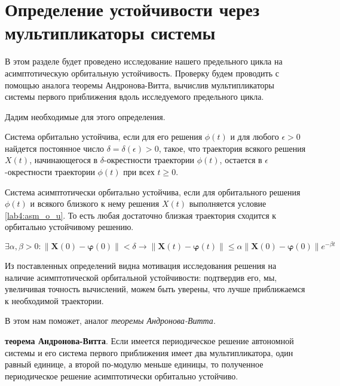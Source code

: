 \chapter{Определение устойчивости через мультипликаторы системы}\label{lab4}

В этом разделе будет проведено исследование нашего предельного цикла
на асимптотическую орбитальную устойчивость. Проверку будем проводить с помощью
аналога теоремы Андронова-Витта, вычислив мультипликаторы системы первого
приближения вдоль исследуемого предельного цикла.

Дадим необходимые для этого определения.

\begin{definition}
    Система орбитально устойчива, если для его решения $\phi(t)$ и  для любого
    $\epsilon > 0$ найдется постоянное число $\delta=\delta(\epsilon) > 0$, такое,
    что траектория всякого решения $X(t)$, начинающегося в $\delta$-окрестности
    траектории $\phi(t)$, остается в $\epsilon$-окрестности траектории $\phi(t)$
    при всех $t \geq 0$.
\end{definition}

\begin{definition}
    Система асимптотически орбитально устойчива, если для орбитального решения
    $\phi(t)$ и всякого близкого к нему решения $X(t)$ выполняется условие
    \ref{lab4:asm_o_u}. То есть любая достаточно близкая
    траектория сходится к орбитально устойчивому решению.
\end{definition}

\begin{equation}\label{lab4:asm_o_u}
    \exists \alpha, \beta > 0:
    \left\| {\mathbf{X}\left( 0 \right) -
            \boldsymbol{\varphi} \left( 0 \right)}
    \right\| < \delta
    \rightarrow
    \left\| {\mathbf{X}\left( t \right) -
            \boldsymbol{\varphi} \left( t \right)}
    \right\| \le \alpha
    \left\| {\mathbf{X}\left( 0 \right) -
            \boldsymbol{\varphi} \left( 0 \right)}
    \right\|{e^{ - \beta t}}
\end{equation}

Из поставленных определений видна мотивация исследования решения на наличие
асимптотической орбитальной устойчивости: подтвердив его, мы, увеличивая
точность вычислений, можем быть уверены, что лучше приближаемся к необходимой
траектории.

В этом нам поможет, аналог \textit{теоремы Андронова-Витта}.

\begin{theorem}
    \textbf{теорема Андронова-Витта}. Если имеется
    периодическое решение автономной системы и его система первого приближения
    имеет два мультипликатора, один равный единице, а второй по-модулю меньше
    единицы, то полученное периодическое решение асимптотически орбитально устойчиво.
\end{theorem}

